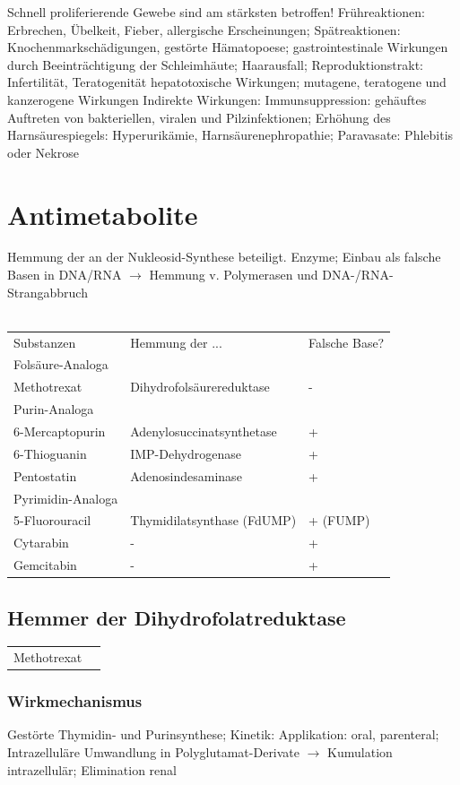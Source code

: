 \documentclass[10pt,a4paper]{report}
\begin{document}
Schnell proliferierende Gewebe sind am stärksten betroffen! Frühreaktionen: Erbrechen, Übelkeit, Fieber, allergische Erscheinungen; Spätreaktionen: Knochenmarkschädigungen, gestörte Hämatopoese; gastrointestinale Wirkungen durch Beeinträchtigung der Schleimhäute; Haarausfall; Reproduktionstrakt: Infertilität, Teratogenität hepatotoxische Wirkungen; mutagene, teratogene und kanzerogene Wirkungen Indirekte Wirkungen: Immunsuppression: gehäuftes Auftreten von bakteriellen, viralen und Pilzinfektionen; Erhöhung des Harnsäurespiegels: Hyperurikämie, Harnsäurenephropathie; Paravasate: Phlebitis oder Nekrose
\section{Antimetabolite} %
\label{sec:antimetabolite}
Hemmung der an der Nukleosid-Synthese beteiligt. Enzyme; Einbau als falsche Basen in DNA/RNA $\rightarrow$ Hemmung v. Polymerasen und DNA-/RNA-Strangabbruch \\ \\
\begin{tabularx}{\textwidth}{XXX}
Substanzen&Hemmung der ...&Falsche Base?\\
Folsäure-Analoga&&\\
Methotrexat&Dihydrofolsäurereduktase&-\\
Purin-Analoga&&\\
6-Mercaptopurin&Adenylosuccinatsynthetase&+\\
6-Thioguanin&IMP-Dehydrogenase&+\\
Pentostatin&Adenosindesaminase&+\\
Pyrimidin-Analoga&&\\
5-Fluorouracil&Thymidilatsynthase (FdUMP)&+ (FUMP)\\
Cytarabin&-&+\\
Gemcitabin&-&+\\
\end{tabularx}
\subsection{Hemmer der Dihydrofolatreduktase} %
\label{sub:hemmer_der_dihydrofolatreduktase}
\begin{tabularx}{\textwidth}{XX}
Methotrexat&\\
\end{tabularx}
\subsubsection{Wirkmechanismus} %
\label{par:wirkmechanismus}
Gestörte Thymidin- und Purinsynthese; Kinetik: Applikation: oral, parenteral; Intrazelluläre Umwandlung in Polyglutamat-Derivate $\rightarrow$ Kumulation intrazellulär; Elimination renal
\end{document}
